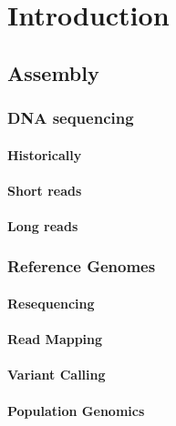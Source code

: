 
\chapter{Introduction}

\ifpdf
    \graphicspath{{Chapter1/Figs/Raster/}{Chapter1/Figs/PDF/}{Chapter1/Figs/}}
\else
    \graphicspath{{Chapter1/Figs/Vector/}{Chapter1/Figs/}}
\fi

\section{Assembly}
\subsection{DNA sequencing}
\subsubsection{Historically}
\subsubsection{Short reads}
\subsubsection{Long reads}

\subsection{Reference Genomes}
\subsubsection{Resequencing}
\subsubsection{Read Mapping}
\subsubsection{Variant Calling}
\subsubsection{Population Genomics}

